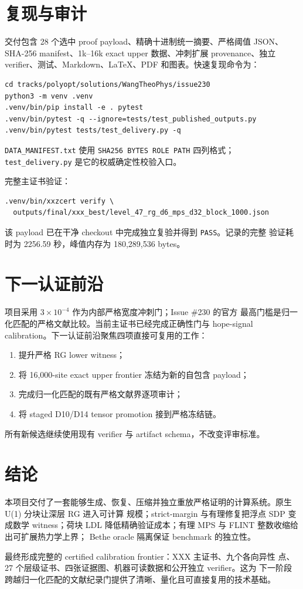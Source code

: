 \documentclass[UTF8,11pt,a4paper]{ctexart}
\newcommand{\code}[1]{\texttt{#1}}
\begin{document}
\section{复现与审计}

交付包含 28 个选中 proof payload、精确十进制统一摘要、严格阈值 JSON、
SHA-256 manifest、1k--16k exact upper 数据、冲刺扩展 provenance、独立
verifier、测试、Markdown、LaTeX、PDF 和图表。快速复现命令为：

\begin{verbatim}
cd tracks/polyopt/solutions/WangTheoPhys/issue230
python3 -m venv .venv
.venv/bin/pip install -e . pytest
.venv/bin/pytest -q --ignore=tests/test_published_outputs.py
.venv/bin/pytest tests/test_delivery.py -q
\end{verbatim}

\code{DATA\_MANIFEST.txt} 使用 \code{SHA256 BYTES ROLE PATH} 四列格式；
\code{test\_delivery.py} 是它的权威确定性校验入口。

完整主证书验证：

\begin{verbatim}
.venv/bin/xxzcert verify \
  outputs/final/xxx_best/level_47_rg_d6_mps_d32_block_1000.json
\end{verbatim}

该 payload 已在干净 checkout 中完成独立复验并得到 \code{PASS}。记录的完整
验证耗时为 2256.59 秒，峰值内存为 180,289,536 bytes。

\section{下一认证前沿}

项目采用 $3\times10^{-4}$ 作为内部严格宽度冲刺门；Issue \#230 的官方
最高门槛是归一化匹配的严格文献比较。当前主证书已经完成正确性门与
hope-signal calibration。下一认证前沿聚焦四项直接可复用的工作：
\begin{enumerate}
  \item 提升严格 RG lower witness；
  \item 将 16,000-site exact upper frontier 冻结为新的自包含 payload；
  \item 完成归一化匹配的既有严格文献界逐项审计；
  \item 将 staged D10/D14 tensor promotion 接到严格冻结链。
\end{enumerate}
所有新候选继续使用现有 verifier 与 artifact schema，不改变评审标准。

\section{结论}

本项目交付了一套能够生成、恢复、压缩并独立重放严格证明的计算系统。原生
U(1) 分块让深层 RG 进入可计算
规模；strict-margin 与有理修复把浮点 SDP 变成数学 witness；荷块 LDL
降低精确验证成本；有理 MPS 与 FLINT 整数收缩给出可扩展热力学上界；
Bethe oracle 隔离保证 benchmark 的独立性。

最终形成完整的 certified calibration frontier：XXX 主证书、九个各向异性
点、27 个层级证书、四张证据图、机器可读数据和公开独立 verifier。这为
下一阶段跨越归一化匹配的文献纪录门提供了清晰、量化且可直接复用的技术基础。



\end{document}
